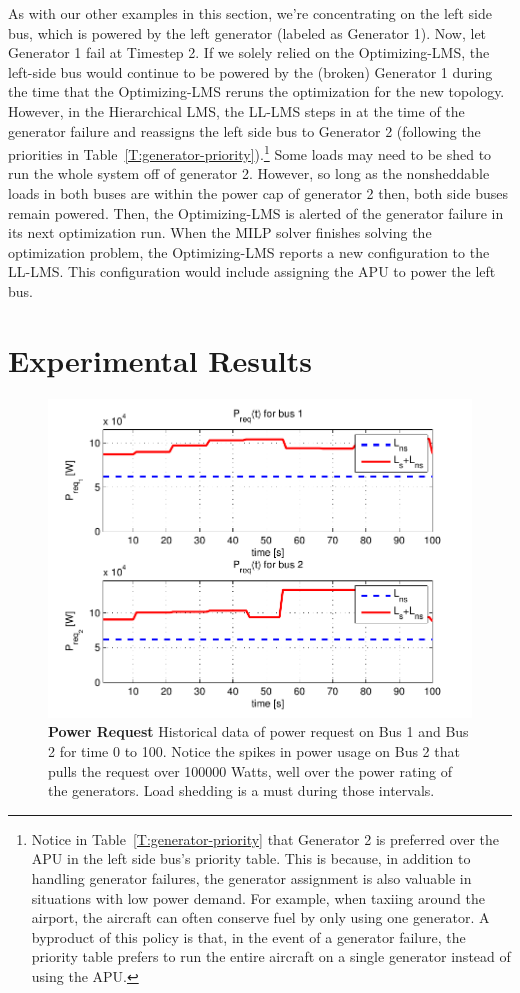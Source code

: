 \documentclass{acm_proc_article-sp}
\begin{document}
As with our other examples in this section, we're concentrating on the left side bus, which is powered by the left generator (labeled as Generator 1).
Now, let Generator 1 fail at Timestep 2. 
If we solely relied on the Optimizing-LMS, the left-side bus would continue to be powered by the (broken) Generator 1 during the time that the Optimizing-LMS reruns the optimization for the new topology.
However, in the Hierarchical LMS, the LL-LMS steps in at the time of the generator failure and reassigns the left side bus to Generator 2 (following the priorities in Table~\ref{T:generator-priority}).\footnote{Notice in Table~\ref{T:generator-priority} that Generator 2 is preferred over the APU in the left side bus's priority table. This is because, in addition to handling generator failures, the generator assignment is also valuable in situations with low power demand. For example, when taxiing around the airport, the aircraft can often conserve fuel by only using one generator. A byproduct of this policy is that, in the event of a generator failure, the priority table prefers to run the entire aircraft on a single generator instead of using the APU.}
Some loads may need to be shed to run the whole system off of generator 2.
However, so long as the nonsheddable loads in both buses are within the power cap of generator 2 then, both side buses remain powered. 
Then, the Optimizing-LMS is alerted of the generator failure in its next optimization run. 
When the MILP solver finishes solving the optimization problem, the Optimizing-LMS reports a new configuration to the LL-LMS. 
This configuration would include assigning the APU to power the left bus.


\section{Experimental Results}
\label{sec:results}
\begin{figure}[htb]
  \centering
  \includegraphics[width=\columnwidth]{figures/preqnofail}
  \caption{\textbf{Power Request}
  Historical data of power request on Bus 1 and Bus 2 for time 0
  to 100. Notice the spikes in power usage on Bus 2 that pulls the
  request over 100000 Watts, well over the power rating of the generators.
  Load shedding is a must during those intervals.}
  \label{fig:preqnofail}
\end{figure}
\end{document}
